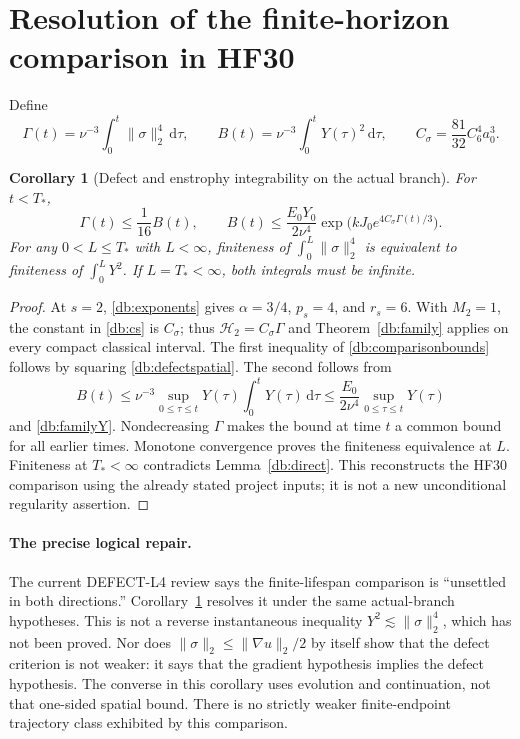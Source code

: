 \documentclass[11pt,a4paper]{article}
\newtheorem{corollary}[theorem]{Corollary}
\theoremstyle{definition}\newtheorem{hypothesis}[theorem]{Hypothesis}
\theoremstyle{remark}\newtheorem{remark}[theorem]{Remark}
\newcommand{\dd}{\,\mathrm d}
\newcommand{\norm}[1]{\lVert #1\rVert}
\numberwithin{equation}{section}
\begin{document}
\section{Resolution of the finite-horizon comparison in HF30}
Define
\[
 \Gamma(t)=\nu^{-3}\int_0^t\norm\sigma_2^4\dd\tau,
 \qquad B(t)=\nu^{-3}\int_0^tY(\tau)^2\dd\tau,
 \qquad C_\sigma=\frac{81}{32}C_6^4a_0^3.
\]
\begin{corollary}[Defect and enstrophy integrability on the actual branch]
\label{db:comparison}
For $t<T_*$,
\begin{equation}\label{db:comparisonbounds}
 \Gamma(t)\le\frac1{16}B(t),\qquad
 B(t)\le\frac{E_0Y_0}{2\nu^4}
   \exp\bigl(kJ_0e^{4C_\sigma\Gamma(t)/3}\bigr).
\end{equation}
For any $0<L\le T_*$ with $L<\infty$, finiteness of
$\int_0^L\norm\sigma_2^4$ is equivalent to finiteness of
$\int_0^L Y^2$. If $L=T_*<\infty$, both integrals must be infinite.
\end{corollary}
\begin{proof}
At $s=2$, \eqref{db:exponents} gives $\alpha=3/4$, $p_s=4$, and $r_s=6$.
With $M_2=1$, the constant in \eqref{db:cs} is $C_\sigma$; thus
$\mathcal H_2=C_\sigma\Gamma$ and Theorem~\ref{db:family} applies on every
compact classical interval. The first inequality of
\eqref{db:comparisonbounds} follows by squaring
\eqref{db:defectspatial}. The second follows from
\[
 B(t)\le\nu^{-3}\sup_{0\le\tau\le t}Y(\tau)
                \int_0^tY(\tau)\dd\tau
       \le\frac{E_0}{2\nu^4}\sup_{0\le\tau\le t}Y(\tau)
\]
and \eqref{db:familyY}. Nondecreasing $\Gamma$ makes the bound at time $t$
a common bound for all earlier times. Monotone convergence proves the
finiteness equivalence at $L$. Finiteness at $T_*<\infty$ contradicts
Lemma~\ref{db:direct}. This reconstructs the HF30 comparison using the
already stated project inputs; it is not a new unconditional regularity
assertion.
\end{proof}

\paragraph{The precise logical repair.}
The current DEFECT-L4 review says the finite-lifespan comparison is
``unsettled in both directions.'' Corollary~\ref{db:comparison} resolves it
under the same actual-branch hypotheses. This is not a reverse instantaneous
inequality $Y^2\lesssim\norm\sigma_2^4$, which has not been proved. Nor does
$\norm\sigma_2\le\norm{\nabla u}_2/2$ by itself show that the defect
criterion is not weaker: it says that the gradient hypothesis implies the
defect hypothesis. The converse in this corollary uses evolution and
continuation, not that one-sided spatial bound. There is no strictly weaker
finite-endpoint trajectory class exhibited by this comparison.
\end{document}
